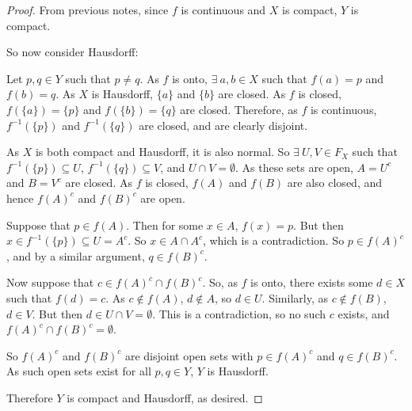 \begin{proof}
	From previous notes, since $f$ is continuous and $X$ is compact, $Y$ is compact.
	
	So now consider Hausdorff:
	
	Let $p,q \in Y$ such that $p \neq q$. As $f$ is onto, $\exists \ a,b \in X$ such that $f(a) = p$ and $f(b) = q$. As $X$ is Hausdorff, $\{a\}$ and $\{b\}$ are closed. As $f$ is closed, $f(\{a\}) = \{p\}$ and $f(\{b\}) = \{q\}$ are closed. Therefore, as $f$ is continuous, $f^{-1}(\{p\})$ and $f^{-1}(\{q\})$ are closed, and are clearly disjoint.
	
	As $X$ is both compact and Hausdorff, it is also normal. So $\exists \ U,V \in F_X$ such that $f^{-1}(\{p\}) \subseteq U$, $f^{-1}(\{q\}) \subseteq V$, and $U \cap V = \emptyset$. As these sets are open, $A = U^c$ and $B = V^c$ are closed. As $f$ is closed, $f(A)$ and $f(B)$ are also closed, and hence $f(A)^c$ and $f(B)^c$ are open.
	
	Suppose that $p \in f(A)$. Then for some $x \in A$, $f(x) = p$. But then $x \in f^{-1}(\{p\}) \subseteq U = A^c$. So $x \in A \cap A^c$, which is a contradiction. So $p \in f(A)^c$, and by a similar argument, $q \in f(B)^c$.
	
	Now suppose that $c \in f(A)^c \cap f(B)^c$. So, as $f$ is onto, there exists some $d \in X$ such that $f(d) = c$. As $c \notin f(A)$, $d \notin A$, so $d \in U$. Similarly, as $c \notin f(B)$, $d \in V$. But then $d \in U \cap V = \emptyset$. This is a contradiction, so no such $c$ exists, and $f(A)^c \cap f(B)^c = \emptyset$.
	
	So $f(A)^c$ and $f(B)^c$ are disjoint open sets with $p \in f(A)^c$ and $q \in f(B)^c$. As such open sets exist for all $p,q \in Y$, $Y$ is Hausdorff.
	
	Therefore $Y$ is compact and Hausdorff, as desired. 
\end{proof}
